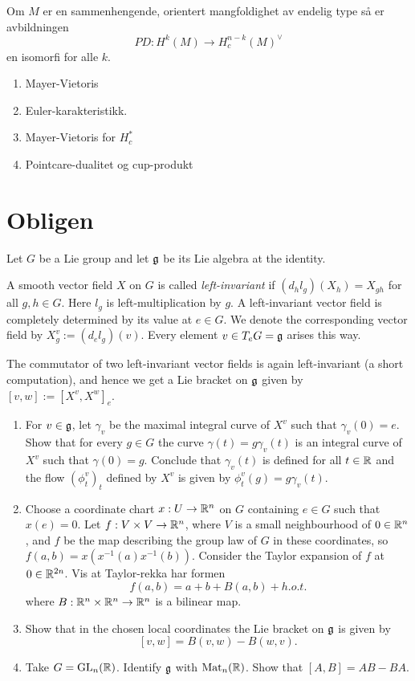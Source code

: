 \documentclass[11pt, english]{article}
\begin{document}
\begin{thm}
Om $M$ er en sammenhengende, orientert mangfoldighet av endelig type så er avbildningen
$$
PD:H^k(M) \to H_c^{n-k}(M)^\vee
$$
en isomorfi for alle $k$. 
\end{thm}

\begin{enumerate}
\item Mayer-Vietoris
\item Euler-karakteristikk.
\item Mayer-Vietoris for $H_c^\ast$
\item Pointcare-dualitet og cup-produkt
\end{enumerate}



\section{Obligen}

\begin{exc}
Let $G$ be a Lie group and let $\mathfrak g$ be its Lie algebra at the identity.

A smooth vector field $X$ on $G$ is called \emph{left-invariant} if $(d_hl_g)(X_h)=X_{gh}$ for all $g,h \in G$. Here $l_g$ is left-multiplication by $g$. A left-invariant vector field is completely determined by its value at $e \in G$. We denote the corresponding vector field by $X^v_g := (d_el_g)(v)$. Every element $v \in T_e G=\mathfrak g$ arises this way. 

The commutator of two left-invariant vector fields is again left-invariant (a short computation), and hence we get a Lie bracket on $\mathfrak g$ given by $[v,w] := [X^v, X^w]_e$. 

\begin{enumerate}
\item For $v \in \mathfrak g$, let $\gamma_v$ be the maximal integral curve of $X^v$ such that $\gamma_v(0)=e$. Show that for every $g \in G$ the curve $\gamma(t)=g \gamma_v(t)$ is an integral curve of $X^v$ such that $\gamma(0)=g$. Conclude that $\gamma_v(t)$ is defined for all $t \in \mathbb{R}$ and the flow $(\phi_t^v)_t$ defined by $X^v$ is given by $\phi_t^v(g)=g\gamma_v(t)$. 

\item Choose a coordinate chart $x:U \to \mathbb{R}^n$ on $G$ containing $e \in G$ such that $x(e)=0$. Let $f:V \times V \to \mathbb{R}^n$, where $V$ is a small neighbourhood of $0 \in \mathbb{R}^n$, and $f$ be the map describing the group law of $G$ in these coordinates, so $f(a,b)=x(x^{-1}(a)x^{-1}(b))$. Consider the Taylor expansion of $f$ at $0 \in \mathbb{R}^{2n}$. Vis at Taylor-rekka har formen
$$
f(a,b) = a+b+B(a,b)+h.o.t.
$$
where $B:\mathbb{R}^n \times \mathbb{R}^n \to \mathbb{R}^n$ is a bilinear map.

\item Show that in the chosen local coordinates the Lie bracket on $\mathfrak g$ is given by
\[
[v,w] = B(v,w) - B(w,v).
\]
\item Take $G=\operatorname{GL}_n(\mathbb{R})$. Identify $\mathfrak g$ with $\mathrm{Mat}_n(\mathbb{R})$. Show that $[A,B] = AB-BA$.
\end{enumerate}
\end{exc}
\end{document}
